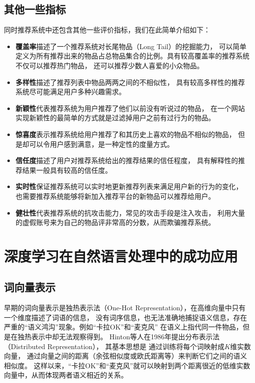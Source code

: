 \subsection{其他一些指标}
同时推荐系统中还包含其他一些评价指标，我们在此简单介绍如下：
\begin{itemize}
\item \textbf{覆盖率}描述了一个推荐系统对长尾物品（Long Tail）的挖掘能力，
可以简单定义为所有推荐出来的物品占总物品集合的比例。具有较高覆盖率的推荐系统不仅可以推荐热门物品，
还可以推荐少数人喜爱的小众物品。
\item \textbf{多样性}描述了推荐列表中物品两两之间的不相似性，
具有较高多样性的推荐系统尽可能满足用户多种兴趣需求。
\item \textbf{新颖性}代表推荐系统为用户推荐了他们以前没有听说过的物品，
在一个网站实现新颖性的最简单的方式就是过滤掉用户之前有过行为的物品。
\item \textbf{惊喜度}表示推荐系统给用户推荐了和其历史上喜欢的物品不相似的物品，
但是却可以令用户感到满意，是一种定性的度量方式。
\item \textbf{信任度}描述了用户对推荐系统给出的推荐结果的信任程度，
具有解释性的推荐结果一般具有较高的信任度。
\item \textbf{实时性}保证推荐系统可以实时地更新推荐列表来满足用户新的行为的变化，
也需要推荐系统能够将新加入推荐平台的新物品可以推荐给用户。
\item \textbf{健壮性}代表推荐系统的抗攻击能力，常见的攻击手段是注入攻击，
利用大量的虚假账号来为自己的物品评非常高的分数，从而欺骗推荐系统。
\end{itemize}

\section{深度学习在自然语言处理中的成功应用}
\subsection{词向量表示}
早期的词向量表示是独热表示法（One-Hot Representation），在高维向量中只有一个维度描述了词语的信息，
没有词序信息，也无法准确地捕捉语义信息，存在严重的``语义鸿沟''现象。例如``卡拉OK''和``麦克风''
在语义上指代同一件物品，但是在独热表示中却无法观察得到。
Hinton等人\parencite{hinton1986learning}在1986年提出分布表示法（Distributed Representation），
其基本思想是 通过训练将每个词映射成$K$维实数向量，
通过向量之间的距离（余弦相似度或欧氏距离等）来判断它们之间的语义相似度。
这样以来，``卡拉OK''和``麦克风''就可以映射到两个距离很近的低维实数向量中，从而体现两者语义相近的关系。


